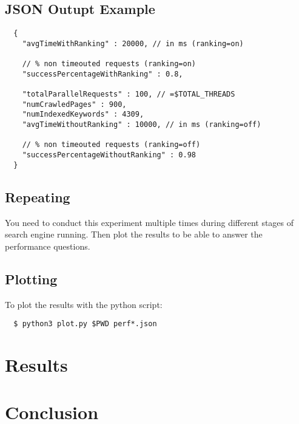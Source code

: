 \documentclass[12pt]{article}
\begin{document}
\subsection{JSON Outupt Example}
\begin{verbatim}
  {
    "avgTimeWithRanking" : 20000, // in ms (ranking=on)

    // % non timeouted requests (ranking=on)
    "successPercentageWithRanking" : 0.8, 

    "totalParallelRequests" : 100, // =$TOTAL_THREADS
    "numCrawledPages" : 900,
    "numIndexedKeywords" : 4309,
    "avgTimeWithoutRanking" : 10000, // in ms (ranking=off)

    // % non timeouted requests (ranking=off)
    "successPercentageWithoutRanking" : 0.98 
  }
\end{verbatim}

\subsection{Repeating}
You need to conduct this experiment multiple times during different stages of search engine running. Then plot the results to be able to answer the performance questions.

\subsection{Plotting}
To plot the results with the python script:
\begin{verbatim}
  $ python3 plot.py $PWD perf*.json
\end{verbatim}

\section{Results}

\section{Conclusion}
\end{document}
